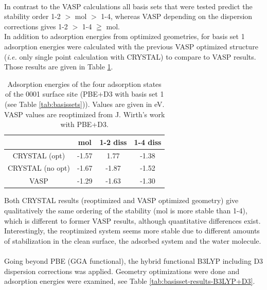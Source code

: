 \documentclass[11pt,DIV=13,BCOR=5mm,a4paper,headinclude]{scrbook}
\begin{document}
\\
In contrast to the VASP calculations all basis sets that were tested predict the stability order 1-2 $>$ mol $>$ 1-4, whereas VASP depending on the dispersion corrections gives 1-2 $>$ 1-4 $\geqq$ mol.
\\
In addition to adsorption energies from optimized geometries, for basis set 1 adsorption energies were calculated with the previous VASP optimized structure (\textit{i.e.} only single point calculation with CRYSTAL) to compare to VASP results.
Those results are given in Table \ref{tab:pbe-vasp-geom}.
\begin{table}[!h]
  \centering
   \caption{Adsorption energies of the four adsorption states of the 0001 surface site (PBE+D3 with basis set 1 (see Table \ref{tab:basissets})).
Values are given in eV.
VASP values are reoptimized from J. Wirth's work with PBE+D3.}
  \begin{tabular}{cccc}%
  \toprule
   &mol & 1-2 diss & 1-4 diss\\\midrule %
CRYSTAL (opt) & -1.57 & 1.77 &-1.38 \\%
   CRYSTAL (no opt)&-1.67 &-1.87 &-1.52\\%
  VASP &-1.29 &-1.63 &-1.30 \\%
  \bottomrule
  \end{tabular}
  \label{tab:pbe-vasp-geom}
\end{table}
Both CRYSTAL results (reoptimized and VASP optimized geometry) give qualitatively the same ordering of the stability (mol is more stable than 1-4), which is different to former VASP results, although quantitative differences exist.
Interestingly, the reoptimized system seems more stable due to different amounts of stabilization in the clean surface, the adsorbed system and the water molecule.
\\\\
Going beyond PBE (GGA functional), the hybrid functional B3LYP including D3 dispersion corrections was applied.
Geometry optimizations were done and adsorption energies were examined, see Table \ref{tab:basisset-results-B3LYP+D3}.
\end{document}
